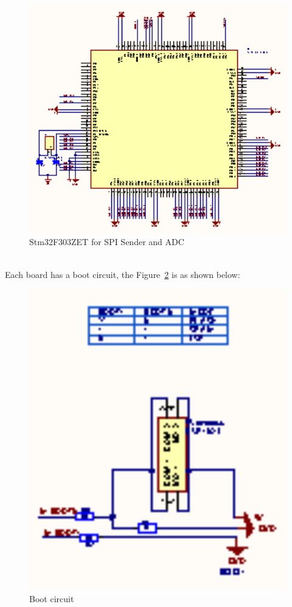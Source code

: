 \begin{figure}[!ht]
	\centering
	\includegraphics[width=16cm]{grafiken/f303.eps}
	\caption{Stm32F303ZET for SPI Sender and ADC} 
	\label{fig:6.5}
\end{figure}
\FloatBarrier
\\

Each board has a boot circuit, the Figure~\ref{fig:6.6} is as shown below:
\begin{figure}[!ht]
	\centering
	\includegraphics[width=16cm]{grafiken/boot_master.eps}
	\caption{Boot circuit} 
	\label{fig:6.6}
\end{figure}
\FloatBarrier
\\

